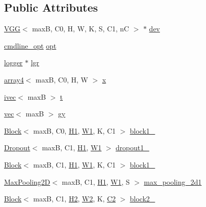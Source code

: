 \subsection*{Public Attributes}
\begin{DoxyCompactItemize}
\item 
\hyperlink{structVGG}{V\+GG}$<$ maxB, C0, H, W, K, S, C1, nC $>$ $\ast$ \hyperlink{structVGG_acb66854790b4211ec6964690dcaba67b}{dev}
\item 
\hyperlink{structcmdline__opt}{cmdline\+\_\+opt} \hyperlink{structVGG_ad161d19c0d519768f32deca8dfd0598b}{opt}
\item 
\hyperlink{structlogger}{logger} $\ast$ \hyperlink{structVGG_a5a8069856b54deb20f0b45e4522d9e4a}{lgr}
\item 
\hyperlink{structarray4}{array4}$<$ maxB, C0, H, W $>$ \hyperlink{structVGG_ab352e8c1793b749d92b85e75ca4f66e8}{x}
\item 
\hyperlink{structivec}{ivec}$<$ maxB $>$ \hyperlink{structVGG_a302cf15e5bd6f920d527334df6f3e2b2}{t}
\item 
\hyperlink{structvec}{vec}$<$ maxB $>$ \hyperlink{structVGG_a4a45e28a72f469b5b1432ee572627c17}{gy}
\item 
\hyperlink{structBlock}{Block}$<$ maxB, C0, \hyperlink{structVGG_a73f189c70eef33b8e8de32929db37b10}{H1}, \hyperlink{structVGG_a01305ab6d90c95eb50c45352203b07e0}{W1}, K, C1 $>$ \hyperlink{structVGG_ac5d2224851fa2936be629e3fdf89c959}{block1\+\_}
\item 
\hyperlink{structDropout}{Dropout}$<$ maxB, C1, \hyperlink{structVGG_a73f189c70eef33b8e8de32929db37b10}{H1}, \hyperlink{structVGG_a01305ab6d90c95eb50c45352203b07e0}{W1} $>$ \hyperlink{structVGG_ac98c33f424e29ec2e36fb4348586b4fd}{dropout1\+\_}
\item 
\hyperlink{structBlock}{Block}$<$ maxB, C1, \hyperlink{structVGG_a73f189c70eef33b8e8de32929db37b10}{H1}, \hyperlink{structVGG_a01305ab6d90c95eb50c45352203b07e0}{W1}, K, C1 $>$ \hyperlink{structVGG_a8f6b6e4fa1009a0730e8ac7417ca4386}{block1\+\_}
\item 
\hyperlink{structMaxPooling2D}{Max\+Pooling2D}$<$ maxB, C1, \hyperlink{structVGG_a73f189c70eef33b8e8de32929db37b10}{H1}, \hyperlink{structVGG_a01305ab6d90c95eb50c45352203b07e0}{W1}, S $>$ \hyperlink{structVGG_a065b2bedbdef89ba2943d696fb54da61}{max\+\_\+pooling\+\_\+2d1}
\item 
\hyperlink{structBlock}{Block}$<$ maxB, C1, \hyperlink{structVGG_a6658da7d5fd275b2af6eb75511ba6f80}{H2}, \hyperlink{structVGG_ac4a4d00b5e2ee41b1d4e8861bbc6c499}{W2}, K, \hyperlink{structVGG_a1e9ad0d15e42696798d44b06ad3c9a9a}{C2} $>$ \hyperlink{structVGG_a29cfe2459ad162095c5d420d12448de3}{block2\+\_}

\end{DoxyCompactItemize}
